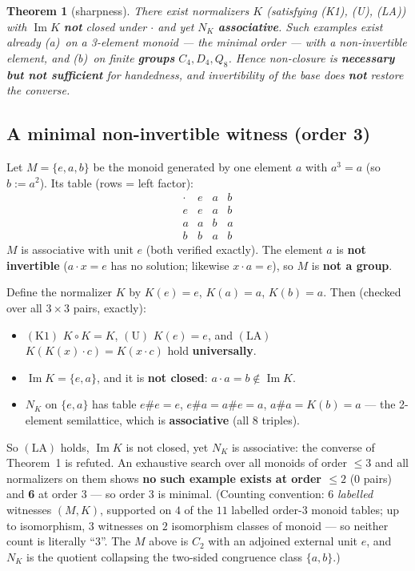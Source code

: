 \documentclass[11pt]{article}
\theoremstyle{plain}
\newtheorem{theorem}{Theorem}
\theoremstyle{definition}
\theoremstyle{remark}
\renewcommand{\Im}{\operatorname{Im}}
\newcommand{\NK}{N_K}
\begin{document}
\begin{theorem}[sharpness]
There exist normalizers $K$ (satisfying (K1), (U), (LA)) with $\Im K$ \textbf{not} closed under
$\cdot$ and yet $\NK$ \textbf{associative}. Such examples exist already (a)~on a 3-element monoid
--- the minimal order --- with a non-invertible element, and (b)~on finite \textbf{groups} $C_4,
D_4, Q_8$. Hence non-closure is \textbf{necessary but not sufficient} for handedness, and
invertibility of the base does \textbf{not} restore the converse.
\end{theorem}

\subsection{A minimal non-invertible witness (order 3)}

Let $M = \{e, a, b\}$ be the monoid generated by one element $a$ with $a^3 = a$ (so $b := a^2$).
Its table (rows = left factor):
\[
\begin{array}{c|ccc}
\cdot & e & a & b \\\hline
e & e & a & b \\
a & a & b & a \\
b & b & a & b
\end{array}
\]
$M$ is associative with unit $e$ (both verified exactly). The element $a$ is \textbf{not
invertible} ($a\cdot x = e$ has no solution; likewise $x\cdot a = e$), so $M$ is \textbf{not a
group}.

Define the normalizer $K$ by $K(e) = e$, $K(a) = a$, $K(b) = a$. Then (checked over all $3\times3$
pairs, exactly):
\begin{itemize}[leftmargin=1.6em]
\item $(\mathrm{K1})$ $K\circ K = K$, $(\mathrm{U})$ $K(e)=e$, and $(\mathrm{LA})$ $K(K(x)\cdot c) =
  K(x\cdot c)$ hold \textbf{universally}.
\item $\Im K = \{e, a\}$, and it is \textbf{not closed}: $a\cdot a = b \notin \Im K$.
\item $\NK$ on $\{e,a\}$ has table $e\#e=e$, $e\#a=a\#e=a$, $a\#a=K(b)=a$ --- the 2-element
  semilattice, which is \textbf{associative} (all 8 triples).
\end{itemize}

So $(\mathrm{LA})$ holds, $\Im K$ is not closed, yet $\NK$ is associative: the converse of
Theorem~1 is refuted. An exhaustive search over all monoids of order $\le 3$ and all normalizers on
them shows \textbf{no such example exists at order $\le 2$} (0 pairs) and \textbf{6} at order 3 ---
so order 3 is minimal. (Counting convention: $6$ \emph{labelled} witnesses $(M,K)$, supported on
$4$ of the $11$ labelled order-$3$ monoid tables; up to isomorphism, $3$ witnesses on $2$
isomorphism classes of monoid --- so neither count is literally ``$3$''. The $M$ above is $C_2$
with an adjoined external unit $e$, and $N_K$ is the quotient collapsing the two-sided congruence
class $\{a,b\}$.)
\end{document}
